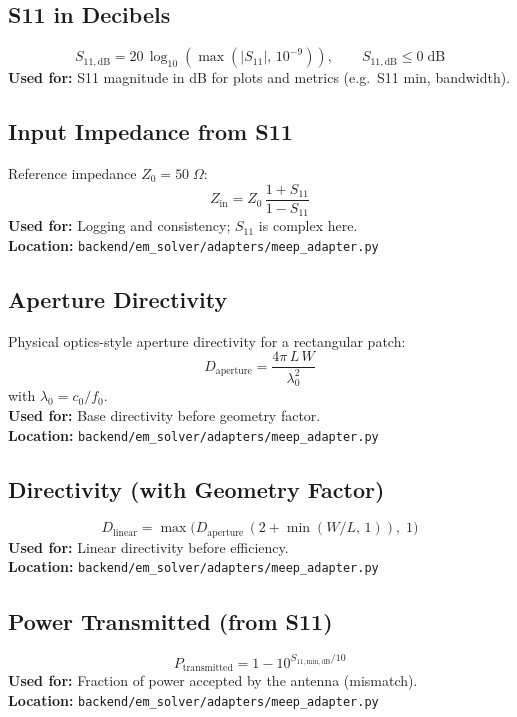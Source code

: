 \documentclass[11pt,a4paper]{article}
\begin{document}
\subsection{S11 in Decibels}
\begin{equation}
S_{11,\mathrm{dB}} = 20\,\log_{10}(\max(|S_{11}|,\, 10^{-9})),\qquad S_{11,\mathrm{dB}} \leq 0\;\mathrm{dB}
\end{equation}
\textbf{Used for:} S11 magnitude in dB for plots and metrics (e.g.\ S11 min, bandwidth).

\subsection{Input Impedance from S11}
Reference impedance \(Z_0 = 50\;\Omega\):
\begin{equation}
Z_{\mathrm{in}} = Z_0\, \frac{1 + S_{11}}{1 - S_{11}}
\end{equation}
\textbf{Used for:} Logging and consistency; \(S_{11}\) is complex here. \\
\textbf{Location:} \texttt{backend/em\_solver/adapters/meep\_adapter.py}

\subsection{Aperture Directivity}
Physical optics-style aperture directivity for a rectangular patch:
\begin{equation}
D_{\mathrm{aperture}} = \frac{4\pi\, L\, W}{\lambda_0^2}
\end{equation}
with \(\lambda_0 = c_0 / f_0\). \\
\textbf{Used for:} Base directivity before geometry factor. \\
\textbf{Location:} \texttt{backend/em\_solver/adapters/meep\_adapter.py}

\subsection{Directivity (with Geometry Factor)}
\begin{equation}
D_{\mathrm{linear}} = \max\bigl(D_{\mathrm{aperture}}\, (2 + \min(W/L,\, 1)),\; 1\bigr)
\end{equation}
\textbf{Used for:} Linear directivity before efficiency. \\
\textbf{Location:} \texttt{backend/em\_solver/adapters/meep\_adapter.py}

\subsection{Power Transmitted (from S11)}
\begin{equation}
P_{\mathrm{transmitted}} = 1 - 10^{S_{11,\mathrm{min,dB}}/10}
\end{equation}
\textbf{Used for:} Fraction of power accepted by the antenna (mismatch). \\
\textbf{Location:} \texttt{backend/em\_solver/adapters/meep\_adapter.py}
\end{document}
